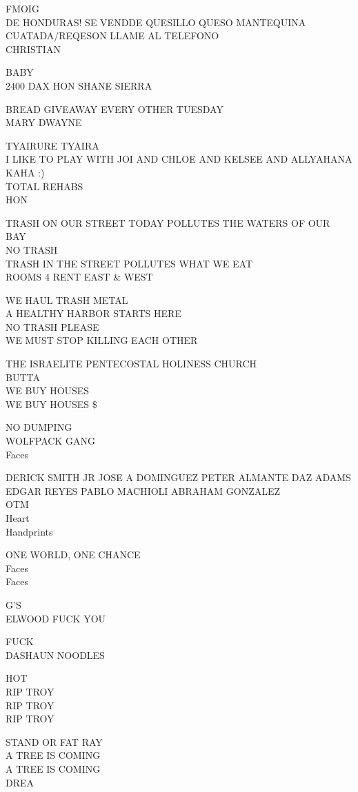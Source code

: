 \documentclass[10pt,letterpaper]{article}
\begin{document}
FMOIG\\
DE HONDURAS!  SE VENDDE QUESILLO QUESO MANTEQUINA CUATADA/REQESON LLAME AL TELEFONO\\
CHRISTIAN

BABY\\
2400 DAX HON SHANE SIERRA

BREAD GIVEAWAY EVERY OTHER TUESDAY\\
MARY DWAYNE

TYAIRURE TYAIRA\\
I LIKE TO PLAY WITH JOI AND CHLOE AND KELSEE AND ALLYAHANA KAHA :)\\
TOTAL REHABS\\
HON

TRASH ON OUR STREET TODAY POLLUTES THE WATERS OF OUR BAY\\
NO TRASH\\
TRASH IN THE STREET POLLUTES WHAT WE EAT\\
ROOMS 4 RENT EAST \& WEST

WE HAUL TRASH METAL\\
A HEALTHY HARBOR STARTS HERE\\
NO TRASH PLEASE\\
WE MUST STOP KILLING EACH OTHER

THE ISRAELITE PENTECOSTAL HOLINESS CHURCH\\
BUTTA\\
WE BUY HOUSES\\
WE BUY HOUSES \$

NO DUMPING\\
WOLFPACK GANG\\
Faces

DERICK SMITH JR JOSE A DOMINGUEZ PETER ALMANTE DAZ ADAMS EDGAR REYES PABLO MACHIOLI ABRAHAM GONZALEZ\\
OTM\\
Heart\\
Handprints

ONE WORLD, ONE CHANCE\\
Faces\\
Faces

G'S\\
ELWOOD FUCK YOU

FUCK\\
DASHAUN NOODLES

HOT\\
RIP TROY\\
RIP TROY\\
RIP TROY

STAND OR FAT RAY\\
A TREE IS COMING\\
A TREE IS COMING\\
DREA
\end{document}
